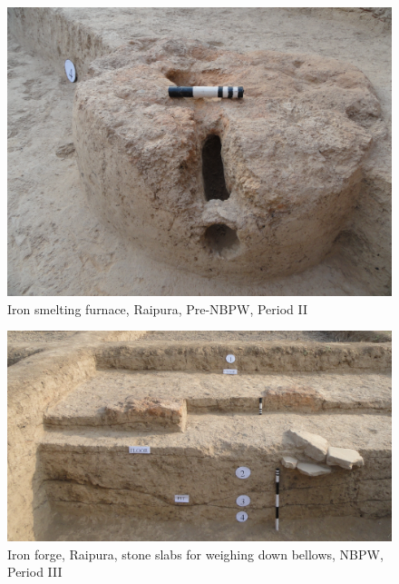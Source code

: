 \begin{figure}[H]
\setcounter{figure}{7}
\includegraphics[scale=0.75]{images/chapter-4/fig008.jpg}
\caption{Iron smelting furnace, Raipura, Pre-NBPW, Period II}\label{chapter-4-fig8}
\end{figure}

\begin{figure}[H]
\includegraphics[scale=0.75]{images/chapter-4/fig009.jpg}
\caption{Iron forge, Raipura, stone slabs for weighing down bellows, NBPW, Period III}\label{chapter-4-fig9}
\end{figure}

\newpage

